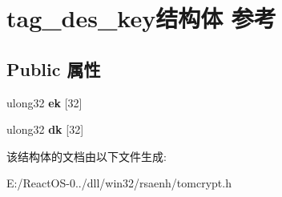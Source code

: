 \hypertarget{structtag__des__key}{}\section{tag\+\_\+des\+\_\+key结构体 参考}
\label{structtag__des__key}
\subsection*{Public 属性}
\begin{DoxyCompactItemize}
\item 
\mbox{\label{structtag__des__key_ac2476cc3311f49048b68adb735c86ede}} 
ulong32 {\bfseries ek} \mbox{[}32\mbox{]}
\item 
\mbox{\label{structtag__des__key_a5e6ae7b7cf7884075df38b1fe3250f08}} 
ulong32 {\bfseries dk} \mbox{[}32\mbox{]}
\end{DoxyCompactItemize}


该结构体的文档由以下文件生成\+:\begin{DoxyCompactItemize}
\item 
E\+:/\+React\+O\+S-\/0../dll/win32/rsaenh/tomcrypt.\+h\end{DoxyCompactItemize}

